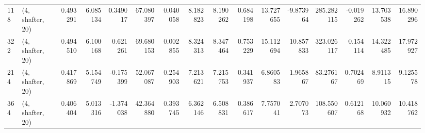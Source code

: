 \begin{tabular}{llrrrrrrrrrrrrrr}
118 &  (4, shafter, 20) &   0.493291 &   6.085134 &   0.349017 &    67.080397 &   0.040058 &   8.182823 &   8.190262 &  0.684198 &  13.727655 &  -9.873964 &   285.282115 & -0.019262 &  13.703538 &  16.890296 \\
322 &  (4, shafter, 20) &   0.494510 &   6.100168 &  -0.621261 &    69.680153 &   0.002855 &   8.324313 &   8.347464 &  0.753229 &  15.112694 & -10.857833 &   323.026117 & -0.154114 &  14.322485 &  17.972927 \\
214 &  (4, shafter, 20) &   0.417869 &   5.154749 &  -0.175399 &    52.067087 &   0.254903 &   7.213621 &   7.215753 &  0.341937 &   6.860583 &   1.965867 &    83.276167 &  0.702469 &   8.911315 &   9.125578 \\
364 &  (4, shafter, 20) &   0.406404 &   5.013316 &  -1.374038 &    42.364880 &   0.393745 &   6.362146 &   6.508831 &  0.386617 &   7.757041 &   2.707073 &   108.550607 &  0.612168 &  10.060932 &  10.418762 \\
\bottomrule
\end{tabular}
